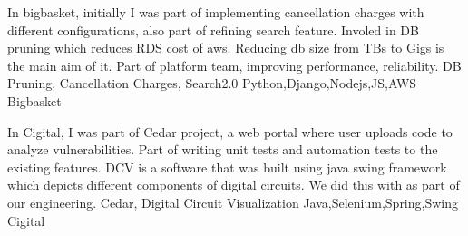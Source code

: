 \documentclass[]{awesome-cv}
\begin{document}
\vspace{-10mm}
\begin{cventries}
	\cventry
	{In bigbasket, initially I was part of implementing cancellation charges with different configurations, also part of refining search feature. Involed in DB pruning which reduces RDS cost of aws. Reducing db size from TBs to Gigs is the main aim of it. Part of platform team, improving performance, reliability.}
	{DB Pruning, Cancellation Charges, Search2.0}
	{Python,Django,Nodejs,JS,AWS}
	{Bigbasket}
	{}
	
	\vspace{-5mm}
\end{cventries}
\begin{cventries}
	\cventry
	{In Cigital, I was part of Cedar project, a web portal where user uploads code to analyze vulnerabilities. Part of writing unit tests and automation tests to the existing features. DCV is a software that was built using java swing framework which depicts different components of digital circuits. We did this with as part of our engineering.}
	{Cedar, Digital Circuit Visualization}
	{Java,Selenium,Spring,Swing}
	{Cigital}
	{}
	
	\vspace{-5mm}
\end{cventries}
%	
 
\end{document}
